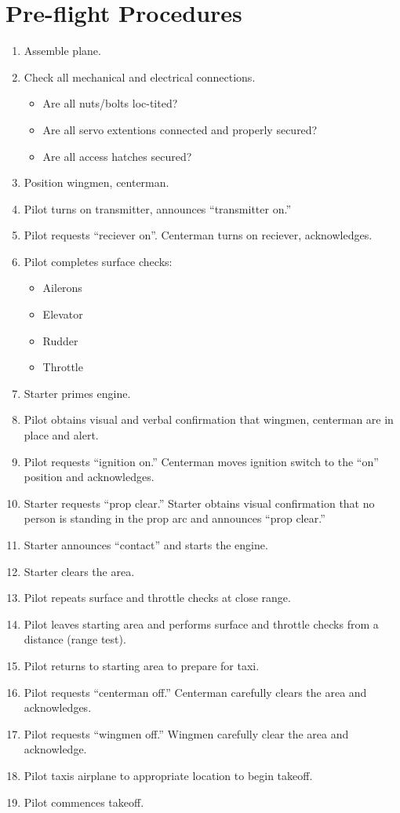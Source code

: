 \documentclass[10pt]{report}
\newcommand{\itemspace}{	\setlength{\itemsep}{0cm} \setlength{\parskip}{0cm}}
\begin{document}
\section{Pre-flight Procedures}
\begin{enumerate}
	\setlength{\itemsep}{0cm}
	\setlength{\parskip}{0cm}
	\item Assemble plane.
	\item Check all mechanical and electrical connections.
		\begin{itemize}
		\itemspace
		\item Are all nuts/bolts loc-tited?
		\item Are all servo extentions connected and properly secured?
		\item Are all access hatches secured?
		\end{itemize}
	\item Position wingmen\footnotemark, centerman\footnotemark.
	\item Pilot turns on transmitter, announces ``transmitter on.''
	\item Pilot requests ``reciever on''.  Centerman turns on reciever, acknowledges.
	\item Pilot completes surface checks:
		\begin{itemize}
		\itemspace
		\item Ailerons
		\item Elevator
		\item Rudder
		\item Throttle
		\end{itemize}
	\item Starter primes engine.
	\item Pilot obtains visual and verbal confirmation that wingmen, centerman are in place and alert.
	\item Pilot requests ``ignition on.''  Centerman moves ignition switch to the ``on'' position and acknowledges.
	\item Starter requests ``prop clear.''  Starter obtains visual confirmation that no person is standing in the prop arc and announces ``prop clear.''
	\item Starter announces ``contact'' and starts the engine.
	\item Starter clears the area.
	\item Pilot repeats surface and throttle checks at close range.
	\item Pilot leaves starting area and performs surface and throttle checks from a distance (range test).
	\item Pilot returns to starting area to prepare for taxi.
	\item Pilot requests ``centerman off.''  Centerman carefully clears the area and acknowledges.
	\item Pilot requests ``wingmen off.''  Wingmen carefully clear the area and acknowledge.
	\item Pilot taxis airplane to appropriate location to begin takeoff.
	\item Pilot commences takeoff.

\end{enumerate}
\end{document}
